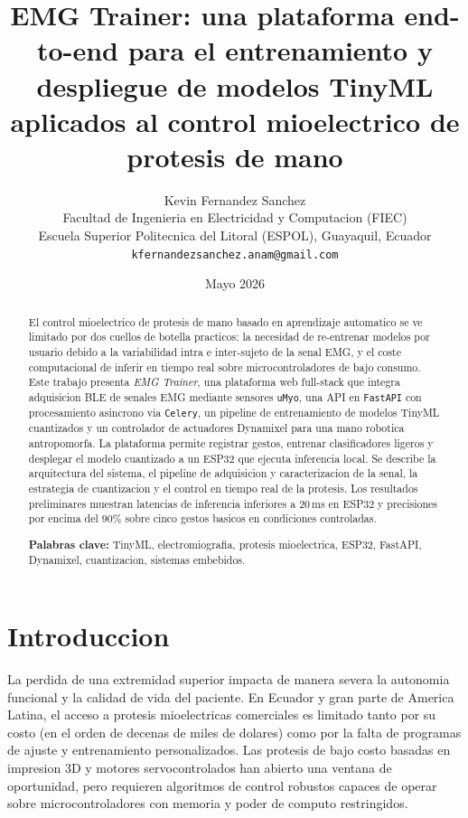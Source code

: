 \documentclass[11pt,a4paper]{article}
\title{\textbf{EMG Trainer: una plataforma end-to-end para el entrenamiento
y despliegue de modelos TinyML aplicados al control mioelectrico de
protesis de mano}}
\author{
  Kevin Fernandez Sanchez \\
  \small Facultad de Ingenieria en Electricidad y Computacion (FIEC) \\
  \small Escuela Superior Politecnica del Litoral (ESPOL), Guayaquil, Ecuador \\
  \small \texttt{kfernandezsanchez.anam@gmail.com}
}
\date{Mayo 2026}
\begin{document}
\maketitle

\begin{abstract}
\noindent
El control mioelectrico de protesis de mano basado en aprendizaje
automatico se ve limitado por dos cuellos de botella practicos: la
necesidad de re-entrenar modelos por usuario debido a la variabilidad
intra e inter-sujeto de la senal EMG, y el coste computacional de
inferir en tiempo real sobre microcontroladores de bajo consumo. Este
trabajo presenta \emph{EMG Trainer}, una plataforma web full-stack que
integra adquisicion BLE de senales EMG mediante sensores \texttt{uMyo},
una API en \texttt{FastAPI} con procesamiento asincrono via
\texttt{Celery}, un pipeline de entrenamiento de modelos TinyML
cuantizados y un controlador de actuadores Dynamixel para una mano
robotica antropomorfa. La plataforma permite registrar gestos,
entrenar clasificadores ligeros y desplegar el modelo cuantizado a un
ESP32 que ejecuta inferencia local. Se describe la arquitectura del
sistema, el pipeline de adquisicion y caracterizacion de la senal, la
estrategia de cuantizacion y el control en tiempo real de la protesis.
Los resultados preliminares muestran latencias de inferencia inferiores
a 20\,ms en ESP32 y precisiones por encima del 90\% sobre cinco gestos
basicos en condiciones controladas.
\medskip

\noindent\textbf{Palabras clave:} TinyML, electromiografia,
protesis mioelectrica, ESP32, FastAPI, Dynamixel, cuantizacion,
sistemas embebidos.
\end{abstract}

\section{Introduccion}
\label{sec:intro}

La perdida de una extremidad superior impacta de manera severa la
autonomia funcional y la calidad de vida del paciente. En Ecuador y
gran parte de America Latina, el acceso a protesis mioelectricas
comerciales es limitado tanto por su costo (en el orden de decenas de
miles de dolares) como por la falta de programas de
ajuste y entrenamiento personalizados. Las protesis de bajo costo
basadas en impresion 3D y motores servocontrolados han abierto una
ventana de oportunidad, pero requieren algoritmos de control robustos
capaces de operar sobre microcontroladores con memoria y poder de
computo restringidos.
\end{document}
